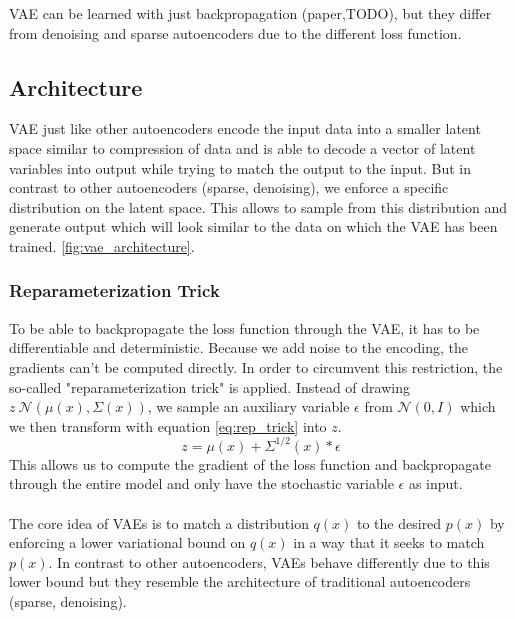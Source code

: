 \documentclass[twoside,11pt,a4paper]{article}
\theoremstyle{break}
\begin{document}
VAE can be learned with just backpropagation (paper,TODO), but they differ from denoising and sparse autoencoders due to the different loss function.



\subsection{Architecture}
\label{sub:vae_architecture}
VAE just like other autoencoders encode the input data into a smaller latent space similar to compression of data and is able to decode a vector of latent variables into output while trying to match the output to the input.
But in contrast to other autoencoders (sparse, denoising), we enforce a specific distribution on the latent space.
This allows to sample from this distribution and generate output which will look similar to the data on which the VAE has been trained.
\ref{fig:vae_architecture}.

\subsubsection{Reparameterization Trick}
To be able to backpropagate the loss function through the VAE, it has to be differentiable and deterministic.
Because we add noise to the encoding, the gradients can't be computed directly. In order to circumvent this restriction, the so-called "reparameterization trick" is applied.
Instead of drawing $z ~ \mathcal{N}(\mu(x), \Sigma(x))$, we sample an auxiliary variable $\epsilon$ from $\mathcal{N}(0, I)$ which we then transform with equation \ref{eq:rep_trick} into $z$.
\begin{equation}
  \label{eq:rep_trick}
  z = \mu(x) + \Sigma^{1/2}(x)*\epsilon
\end{equation}
This allows us to compute the gradient of the loss function and backpropagate through the entire model and only have the stochastic variable $\epsilon$ as input.\\\\

The core idea of VAEs is to match a distribution $q(x)$ to the desired $p(x)$ by enforcing a lower variational bound on $q(x)$ in a way that it seeks to match $p(x)$.
In contrast to other autoencoders, VAEs behave differently due to this lower bound but they resemble the architecture of traditional autoencoders (sparse, denoising).
\end{document}
